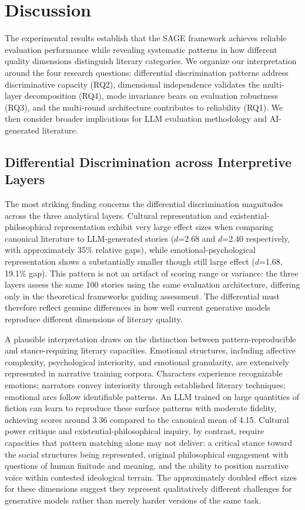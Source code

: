 \section{Discussion}
\label{sec:discussion}

The experimental results establish that the SAGE framework achieves reliable evaluation performance while revealing systematic patterns in how different quality dimensions distinguish literary categories. We organize our interpretation around the four research questions: differential discrimination patterns address discriminative capacity (RQ2), dimensional independence validates the multi-layer decomposition (RQ4), mode invariance bears on evaluation robustness (RQ3), and the multi-round architecture contributes to reliability (RQ1). We then consider broader implications for LLM evaluation methodology and AI-generated literature.

\subsection{Differential Discrimination across Interpretive Layers}

The most striking finding concerns the differential discrimination magnitudes across the three analytical layers. Cultural representation and existential-philosophical representation exhibit very large effect sizes when comparing canonical literature to LLM-generated stories ($d$=2.68 and $d$=2.40 respectively, with approximately 35\% relative gaps), while emotional-psychological representation shows a substantially smaller though still large effect ($d$=1.68, 19.1\% gap). This pattern is not an artifact of scoring range or variance: the three layers assess the same 100 stories using the same evaluation architecture, differing only in the theoretical frameworks guiding assessment. The differential must therefore reflect genuine differences in how well current generative models reproduce different dimensions of literary quality.

A plausible interpretation draws on the distinction between pattern-reproducible and stance-requiring literary capacities. Emotional structures, including affective complexity, psychological interiority, and emotional granularity, are extensively represented in narrative training corpora. Characters experience recognizable emotions; narrators convey interiority through established literary techniques; emotional arcs follow identifiable patterns. An LLM trained on large quantities of fiction can learn to reproduce these surface patterns with moderate fidelity, achieving scores around 3.36 compared to the canonical mean of 4.15. Cultural power critique and existential-philosophical inquiry, by contrast, require capacities that pattern matching alone may not deliver: a critical stance toward the social structures being represented, original philosophical engagement with questions of human finitude and meaning, and the ability to position narrative voice within contested ideological terrain. The approximately doubled effect sizes for these dimensions suggest they represent qualitatively different challenges for generative models rather than merely harder versions of the same task.

